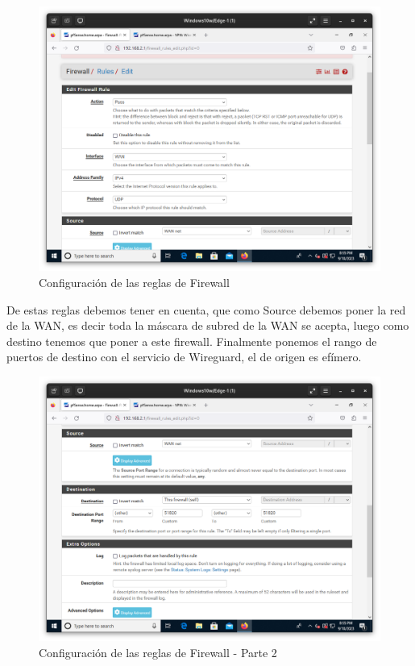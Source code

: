\begin{figure}[H]
	\centering
	\includegraphics[scale=0.30]{11}
	\caption{Configuración de las reglas de Firewall}
\end{figure}

De estas reglas debemos tener en cuenta, que como Source debemos poner la red de la WAN, es decir toda la máscara de subred de la WAN se acepta, luego como destino tenemos que poner a este firewall. Finalmente ponemos el rango de puertos de destino con el servicio de Wireguard, el de origen es efímero.

\begin{figure}[H]
	\centering
	\includegraphics[scale=0.30]{12}
	\caption{Configuración de las reglas de Firewall - Parte 2}
\end{figure}

